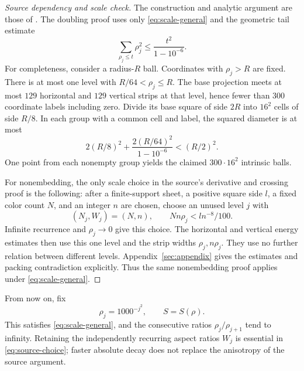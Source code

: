 \documentclass[11pt]{article}
\theoremstyle{remark}
\begin{document}
\begin{proof}[Source dependency and scale check]
The construction and analytic argument are those of \cite[Sections 2--5]{OpenAI}. The doubling proof uses only \eqref{eq:scale-general} and the geometric tail estimate
\begin{equation}\label{eq:tail}
 \sum_{\rho_j\le t}\rho_j^2\le\frac{t^2}{1-10^{-6}}.
\end{equation}
For completeness, consider a radius-$R$ ball. Coordinates with $\rho_j>R$ are fixed. There is at most one level with $R/64<\rho_j\le R$. The base projection meets at most $129$ horizontal and $129$ vertical strips at that level, hence fewer than $300$ coordinate labels including zero. Divide its base square of side $2R$ into $16^2$ cells of side $R/8$. In each group with a common cell and label, the squared diameter is at most
\[
 2(R/8)^2+\frac{2(R/64)^2}{1-10^{-6}}<(R/2)^2.
\]
One point from each nonempty group yields the claimed $300\cdot16^2$ intrinsic balls.

For nonembedding, the only scale choice in the source's derivative and crossing proof is the following: after a finite-support sheet, a positive square side $l$, a fixed color count $N$, and an integer $n$ are chosen, choose an unused level $j$ with
\begin{equation}\label{eq:source-choice}
 (N_j,W_j)=(N,n),\qquad Nn\rho_j<l n^{-8}/100.
\end{equation}
Infinite recurrence and $\rho_j\to0$ give this choice. The horizontal and vertical energy estimates then use this one level and the strip widths $\rho_j,n\rho_j$. They use no further relation between different levels. Appendix~\ref{sec:appendix} gives the estimates and packing contradiction explicitly. Thus the same nonembedding proof applies under \eqref{eq:scale-general}.
\end{proof}

From now on, fix
\begin{equation}\label{eq:superlacunary}
 \rho_j=1000^{-j^2},\qquad S=S(\rho).
\end{equation}
This satisfies \eqref{eq:scale-general}, and the consecutive ratios $\rho_j/\rho_{j+1}$ tend to infinity. Retaining the independently recurring aspect ratios $W_j$ is essential in \eqref{eq:source-choice}; faster absolute decay does not replace the anisotropy of the source argument.
\end{document}
